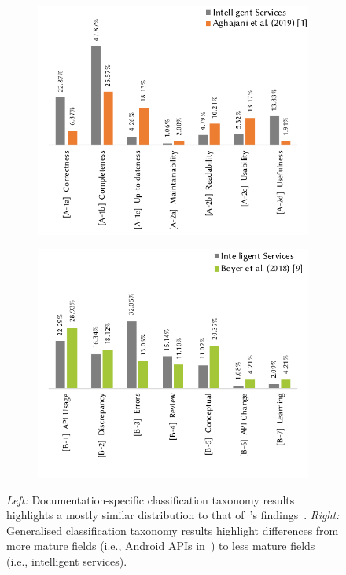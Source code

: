 \begin{figure}[t]
  \centering
  \begin{subfigure}[c]{0.49\linewidth}
    \centering
    \includegraphics[width=\linewidth]{a-compare.pdf}
  \end{subfigure}
  \hfill
  \begin{subfigure}[c]{0.49\linewidth}
    \centering
    \includegraphics[width=\linewidth]{b-compare.pdf}
  \end{subfigure}
  \caption{
    \textit{Left:} Documentation-specific classification taxonomy results highlights a mostly similar distribution to that of~\citeauthor{Aghajani:2019bo}'s findings~\citep{Aghajani:2019bo}.
    \textit{Right:} Generalised classification taxonomy results highlight differences from more mature fields (i.e., Android APIs in~\citet{Beyer:2018fm}) to less mature fields (i.e., intelligent services). 
  }
  \label{icse2020:fig:ab-compare}
\end{figure}

